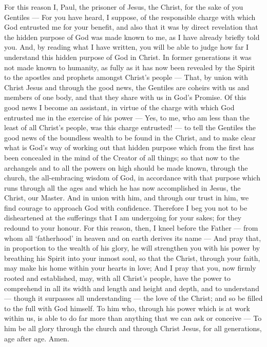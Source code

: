  For this reason I, Paul, the prisoner of Jesus, the Christ,
for the sake of you Gentiles ---  For you have heard, I
suppose, of the responsible charge with which God entrusted me for your
benefit,  and also that it was by direct revelation that the
hidden purpose of God was made known to me, as I have already briefly
told you.  And, by reading what I have written, you will be
able to judge how far I understand this hidden purpose of God in Christ.
 In former generations it was not made known to humanity, as
fully as it has now been revealed by the Spirit to the apostles and
prophets amongst Christ's people ---  That, by union with
Christ Jesus and through the good news, the Gentiles are coheirs with us
and members of one body, and that they share with us in God's Promise.
 Of this good news I become an assistant, in virtue of the
charge with which God entrusted me in the exercise of his power ---
 Yes, to me, who am less than the least of all Christ's
people, was this charge entrusted! --- to tell the Gentiles the good
news of the boundless wealth to be found in the Christ,  and
to make clear what is God's way of working out that hidden purpose which
from the first has been concealed in the mind of the Creator of all
things;  so that now to the archangels and to all the
powers on high should be made known, through the church, the
all-embracing wisdom of God,  in accordance with that
purpose which runs through all the ages and which he has now
accomplished in Jesus, the Christ, our Master.  And in
union with him, and through our trust in him, we find courage to
approach God with confidence.  Therefore I beg you not to
be disheartened at the sufferings that I am undergoing for your sakes;
for they redound to your honour.  For this reason, then, I
kneel before the Father ---  from whom all `fatherhood' in
heaven and on earth derives its name ---  And pray that, in
proportion to the wealth of his glory, he will strengthen you with his
power by breathing his Spirit into your inmost soul,  so
that the Christ, through your faith, may make his home within your
hearts in love; And I pray that you, now firmly rooted and established,
may, with all Christ's people,  have the power to
comprehend in all its width and length and height and depth,
 and to understand --- though it surpasses all
understanding --- the love of the Christ; and so be filled to the full
with God himself.  To him who, through his power which is
at work within us, is able to do far more than anything that we can ask
or conceive ---  To him be all glory through the church and
through Christ Jesus, for all generations, age after age. Amen.

